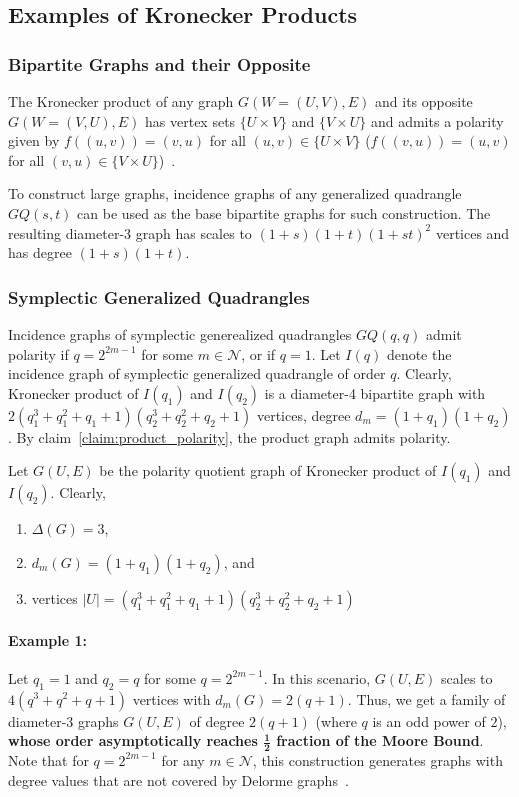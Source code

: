 \subsection{Examples of Kronecker Products}
\subsubsection{Bipartite Graphs and their Opposite}
The Kronecker product of any graph $G(W=(U,V),E)$ and its
opposite $G(W=(V,U),E)$ has vertex sets $\{U\times V\}$
and $\{V\times U\}$ and admits a polarity given by 
$f((u, v))=(v,u)$ for all $(u,v)\in \{U\times V\}$
($f((v,u))=(u,v)$ for all $(v,u)\in \{V\times U\}$)~\cite{delorme1985large}.

To construct large graphs, incidence 
graphs of any generalized quadrangle $GQ(s,t)$ can be 
used as the base bipartite graphs for such construction. The resulting diameter-3 graph has
scales to $(1+s)(1+t)(1+st)^2$ vertices and has
degree $(1+s)(1+t)$.

\subsubsection{Symplectic Generalized Quadrangles}
Incidence graphs of symplectic generealized quadrangles
$GQ(q,q)$ admit polarity if $q=2^{2m-1}$ for some
$m\in \mathcal{N}$, or if $q=1$. 
Let $I(q)$ denote the incidence graph of symplectic
generalized quadrangle of order $q$.
Clearly, Kronecker product of 
$I(q_1)$ and $I(q_2)$ is a diameter-4 bipartite graph
with $2(q_1^3+q_1^2+q_1+1)(q_2^3+q_2^2+q_2+1)$ vertices, degree $d_{m}=(1+q_1)(1+q_2)$.
By claim~\ref{claim:product_polarity}, the
product graph admits polarity.

Let $G(U,E)$ be the polarity quotient graph of Kronecker product of $I(q_1)$ and $I(q_2)$. Clearly, 
\begin{enumerate}
    \item $\Delta(G)=3$,
    \item $d_{m}(G)=(1+q_1)(1+q_2)$, and
    \item vertices $|U|=(q_1^3+q_1^2+q_1+1)(q_2^3+q_2^2+q_2+1)$
\end{enumerate}

\paragraph{Example 1:} Let $q_1=1$ and $q_2=q$ for some $q=2^{2m-1}$.
In this scenario, $G(U,E)$ scales to  $4(q^3 + q^2 + q + 1)$ vertices with $d_{m}(G)=2(q+1)$.
Thus, we get a family of diameter-3 graphs $G(U,E)$
of degree $2(q+1)$ (where $q$ is an odd power of $2$), \textbf{whose order asymptotically reaches $\mathbf{\frac{1}{2}}$ fraction of the
Moore Bound}. Note that for $q = 2^{2m-1}$ for any 
$m\in \mathcal{N}$, this construction generates graphs with degree values that are
not covered by Delorme graphs~\cite{delorme1985grands}.

